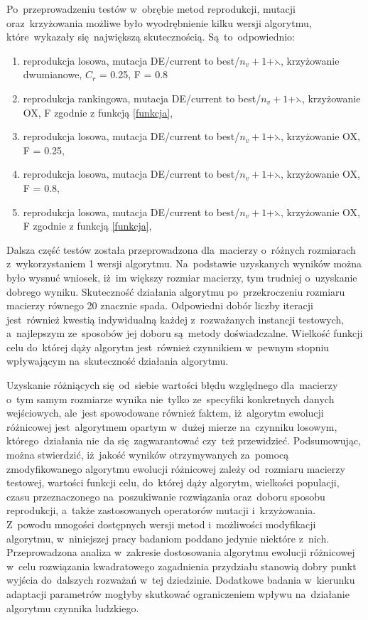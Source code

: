 Po~przeprowadzeniu testów w~obrębie metod reprodukcji, mutacji oraz~krzyżowania możliwe było wyodrębnienie kilku wersji algorytmu, które~wykazały się~największą skutecznością. Są~to~odpowiednio:\\
\begin{enumerate}
\item reprodukcja losowa, mutacja DE/current to best/$n_{v}+1$+$\leftthreetimes$, krzyżowanie dwumianowe, $C_{r}$ = 0.25, F = 0.8
\item reprodukcja rankingowa, mutacja DE/current to best/$n_{v}+1$+$\leftthreetimes$, krzyżowanie OX, F zgodnie z funkcją \ref{funkcja},
\item reprodukcja losowa, mutacja DE/current to best/$n_{v}+1$+$\leftthreetimes$, krzyżowanie OX, F = 0.25,
\item reprodukcja losowa, mutacja DE/current to best/$n_{v}+1$+$\leftthreetimes$, krzyżowanie OX, F = 0.8,
\item reprodukcja losowa, mutacja DE/current to best/$n_{v}+1$+$\leftthreetimes$, krzyżowanie OX, F zgodnie z funkcją \ref{funkcja},
\end{enumerate}
Dalsza część testów została przeprowadzona dla~macierzy o~różnych rozmiarach z~wykorzystaniem 1 wersji algorytmu. Na~podstawie uzyskanych wyników można było wysnuć wniosek, iż~im większy rozmiar macierzy, tym trudniej o~uzyskanie dobrego wyniku. Skuteczność działania algorytmu po~przekroczeniu rozmiaru macierzy równego 20 znacznie spada. Odpowiedni dobór liczby iteracji jest~również kwestią indywidualną każdej z~rozważanych instancji testowych, a~najlepszym ze~sposobów jej doboru są~metody doświadczalne. Wielkość funkcji celu do~której dąży algorytm jest~również czynnikiem w~pewnym stopniu wpływającym na~skuteczność działania algorytmu.

Uzyskanie różniących się~od~siebie wartości błędu względnego dla~macierzy o~tym samym rozmiarze wynika nie~tylko ze~specyfiki konkretnych danych wejściowych, ale~jest spowodowane również faktem, iż~algorytm ewolucji różnicowej jest~algorytmem opartym w~dużej mierze na~czynniku losowym, którego~działania nie~da się~zagwarantować czy~też przewidzieć. Podsumowując, można stwierdzić, iż~jakość wyników otrzymywanych za~pomocą zmodyfikowanego algorytmu ewolucji różnicowej zależy od~rozmiaru macierzy testowej, wartości funkcji celu, do~której dąży algorytm, wielkości populacji, czasu przeznaczonego na~poszukiwanie rozwiązania oraz~doboru sposobu reprodukcji, a~także zastosowanych operatorów mutacji i~krzyżowania.\\
Z~powodu mnogości dostępnych wersji metod i~możliwości modyfikacji algorytmu, w~niniejszej pracy badaniom poddano jedynie niektóre z~nich. Przeprowadzona analiza w~zakresie dostosowania algorytmu ewolucji różnicowej w~celu rozwiązania kwadratowego zagadnienia przydziału stanowią dobry punkt wyjścia do~dalszych rozważań w~tej dziedzinie. Dodatkowe badania w~kierunku adaptacji parametrów mogłyby skutkować ograniczeniem wpływu na~działanie algorytmu czynnika ludzkiego.
